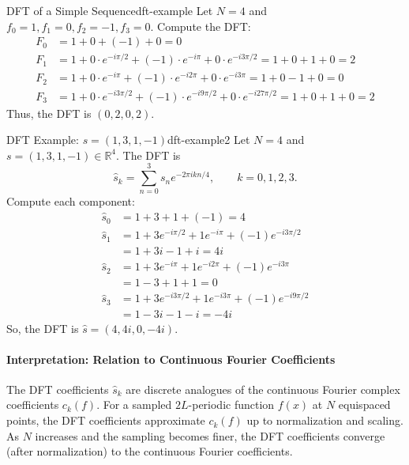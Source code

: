 \begin{example}{DFT of a Simple Sequence}{dft-example}
    Let $N = 4$ and $f_0 = 1, f_1 = 0, f_2 = -1, f_3 = 0$. Compute the DFT:
    \begin{align*}
        F_0 & = 1 + 0 + (-1) + 0 = 0                                                                           \\
        F_1 & = 1 + 0 \cdot e^{-i\pi/2} + (-1) \cdot e^{-i\pi} + 0 \cdot e^{-i3\pi/2} = 1 + 0 + 1 + 0 = 2      \\
        F_2 & = 1 + 0 \cdot e^{-i\pi} + (-1) \cdot e^{-i2\pi} + 0 \cdot e^{-i3\pi} = 1 + 0 - 1 + 0 = 0         \\
        F_3 & = 1 + 0 \cdot e^{-i3\pi/2} + (-1) \cdot e^{-i9\pi/2} + 0 \cdot e^{-i27\pi/2} = 1 + 0 + 1 + 0 = 2
    \end{align*}
    Thus, the DFT is $ (0, 2, 0, 2) $.
\end{example}

\begin{example}{DFT Example: $s = (1, 3, 1, -1)$}{dft-example2}
    Let $N = 4$ and $s = (1, 3, 1, -1) \in \mathbb{R}^4$. The DFT is
    \[
        \hat{s}_k = \sum_{n=0}^{3} s_n e^{-2\pi i k n / 4}, \qquad k = 0,1,2,3.
    \]
    Compute each component:
    \begin{align*}
        \hat{s}_0 & = 1 + 3 + 1 + (-1) = 4                                  \\
        \hat{s}_1 & = 1 + 3 e^{-i\pi/2} + 1 e^{-i\pi} + (-1) e^{-i3\pi/2}   \\
                  & = 1 + 3i - 1 + i = 4i                                   \\
        \hat{s}_2 & = 1 + 3 e^{-i\pi} + 1 e^{-i2\pi} + (-1) e^{-i3\pi}      \\
                  & = 1 - 3 + 1 + 1 = 0                                     \\
        \hat{s}_3 & = 1 + 3 e^{-i3\pi/2} + 1 e^{-i3\pi} + (-1) e^{-i9\pi/2} \\
                  & = 1 - 3i - 1 - i = -4i
    \end{align*}
    So, the DFT is $\hat{s} = (4, 4i, 0, -4i)$.
\end{example}

\paragraph{Interpretation: Relation to Continuous Fourier Coefficients}
The DFT coefficients $\hat{s}_k$ are discrete analogues of the continuous Fourier complex coefficients $c_k(f)$. For a sampled $2L$-periodic function $f(x)$ at $N$ equispaced points, the DFT coefficients approximate $c_k(f)$ up to normalization and scaling. As $N$ increases and the sampling becomes finer, the DFT coefficients converge (after normalization) to the continuous Fourier coefficients.

